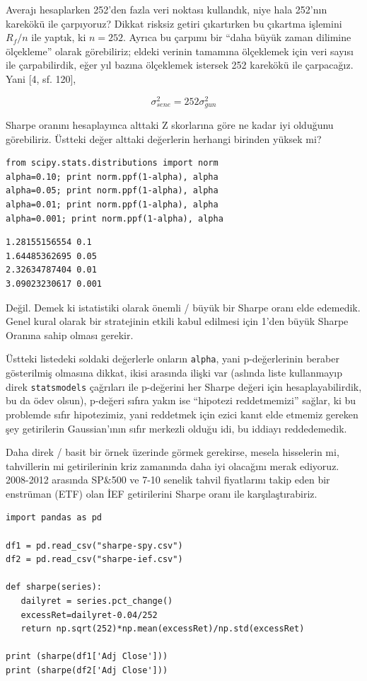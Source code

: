 \documentclass[12pt,fleqn]{article}\usepackage{../../common}
\begin{document}
Averajı hesaplarken 252'den fazla veri noktası kullandık, niye hala 252'nın
karekökü ile çarpıyoruz? Dikkat risksiz getiri çıkartırken bu çıkartma
işlemini $R_f/n$ ile yaptık, ki $n=252$. Ayrıca bu çarpımı bir ``daha büyük
zaman dilimine ölçekleme'' olarak görebiliriz; eldeki verinin tamamına
ölçeklemek için veri sayısı ile çarpabilirdik, eğer yıl bazına ölçeklemek
istersek 252 karekökü ile çarpacağız. Yani [4, sf. 120], 

$$ \sigma_{sene}^2 = 252 \sigma_{gun}^2 $$

Sharpe oranını hesaplayınca alttaki Z skorlarına göre ne kadar iyi olduğunu
görebiliriz. Üstteki değer alttaki değerlerin herhangi birinden yüksek mi?

\begin{verbatim}
from scipy.stats.distributions import norm
alpha=0.10; print norm.ppf(1-alpha), alpha
alpha=0.05; print norm.ppf(1-alpha), alpha
alpha=0.01; print norm.ppf(1-alpha), alpha
alpha=0.001; print norm.ppf(1-alpha), alpha
\end{verbatim}

\begin{verbatim}
1.28155156554 0.1
1.64485362695 0.05
2.32634787404 0.01
3.09023230617 0.001
\end{verbatim}

Değil. Demek ki istatistiki olarak önemli / büyük bir Sharpe oranı elde
edemedik. Genel kural olarak bir stratejinin etkili kabul edilmesi için
1'den büyük Sharpe Oranına sahip olması gerekir. 

Üstteki listedeki soldaki değerlerle onların \verb!alpha!, yani
p-değerlerinin beraber gösterilmiş olmasına dikkat, ikisi arasında ilişki
var (aslında liste kullanmayıp direk \verb!statsmodels! çağrıları ile
p-değerini her Sharpe değeri için hesaplayabilirdik, bu da ödev olsun),
p-değeri sıfıra yakın ise ``hipotezi reddetmemizi'' sağlar, ki bu problemde
sıfır hipotezimiz, yani reddetmek için ezici kanıt elde etmemiz gereken
şey getirilerin Gaussian'ının sıfır merkezli olduğu idi, bu iddiayı
reddedemedik.

Daha direk / basit bir örnek üzerinde görmek gerekirse, mesela hisselerin
mi, tahvillerin mi getirilerinin kriz zamanında daha iyi olacağını merak
ediyoruz. 2008-2012 arasında SP\&500 ve 7-10 senelik tahvil fiyatlarını
takip eden bir enstrüman (ETF) olan İEF getirilerini Sharpe oranı
ile karşılaştırabiriz.

\begin{verbatim}
import pandas as pd

df1 = pd.read_csv("sharpe-spy.csv")
df2 = pd.read_csv("sharpe-ief.csv")

def sharpe(series):
   dailyret = series.pct_change()
   excessRet=dailyret-0.04/252
   return np.sqrt(252)*np.mean(excessRet)/np.std(excessRet)

print (sharpe(df1['Adj Close']))
print (sharpe(df2['Adj Close']))
\end{verbatim}
\end{document}
